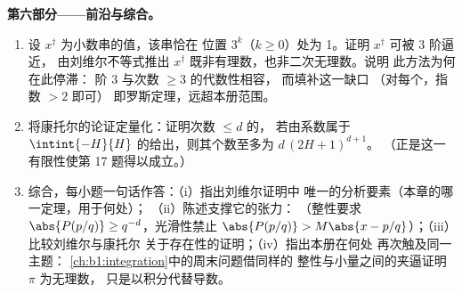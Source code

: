 \begin{problem}
\medskip
\noindent\textbf{第六部分——前沿与综合。}
\begin{enumerate}[resume]
  \item 设 $x^\dagger$ 为小数串的值，该串恰在
        位置 $3^k$（$k \geq 0$）处为 1。证明
        $x^\dagger$ 可被 $3$ 阶逼近，
        由刘维尔不等式推出 $x^\dagger$ 既非有理数，也非二次无理数。说明
        此方法为何在此停滞：
        阶 $3$ 与次数 $\geq 3$ 的代数性相容，
        而填补这一缺口
        （对每个，指数 $> 2$ 即可）
        即罗斯定理，远超本册范围。
  \item 将康托尔的论证定量化：证明次数 $\leq d$ 的，
        若由系数属于 $\intint{-H}{H}$ 的给出，则其个数至多为
        $d\,(2H + 1)^{d+1}$。
        （正是这一有限性使第 17 题得以成立。）
  \item 综合，每小题一句话作答：（i）指出刘维尔证明中
        唯一的分析要素（本章的哪一定理，用于何处）；
        （ii）陈述支撑它的张力：
        （整性要求 $\abs{P(p/q)} \geq
        q^{-d}$，光滑性禁止 $\abs{P(p/q)} > M\abs{x -
        p/q}$）；（iii）比较刘维尔与康托尔
        关于存在性的证明；（iv）指出本册在何处
        再次触及同一主题：
        \cref{ch:b1:integration}中的周末问题借同样的
        整性与小量之间的夹逼证明 $\pi$ 为无理数，
        只是以积分代替导数。
\end{enumerate}
\end{problem}
